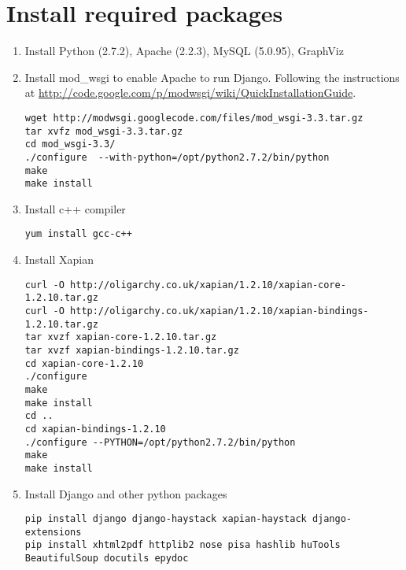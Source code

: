 \documentclass[twoside]{book}
\begin{document}
\section{Install required packages}
\begin{enumerate}
\item Install Python (2.7.2), Apache (2.2.3), MySQL (5.0.95), GraphViz
	
\item Install mod\_wsgi to enable Apache to run Django. Following the instructions at \url{http://code.google.com/p/modwsgi/wiki/QuickInstallationGuide}.
\begin{verbatim}
wget http://modwsgi.googlecode.com/files/mod_wsgi-3.3.tar.gz
tar xvfz mod_wsgi-3.3.tar.gz
cd mod_wsgi-3.3/
./configure  --with-python=/opt/python2.7.2/bin/python
make
make install
\end{verbatim}
	
\item Install c++ compiler
\begin{verbatim}
yum install gcc-c++
\end{verbatim}
  
\item Install Xapian
\begin{verbatim}
curl -O http://oligarchy.co.uk/xapian/1.2.10/xapian-core-1.2.10.tar.gz
curl -O http://oligarchy.co.uk/xapian/1.2.10/xapian-bindings-1.2.10.tar.gz
tar xvzf xapian-core-1.2.10.tar.gz
tar xvzf xapian-bindings-1.2.10.tar.gz
cd xapian-core-1.2.10
./configure
make
make install
cd ..
cd xapian-bindings-1.2.10
./configure --PYTHON=/opt/python2.7.2/bin/python
make
make install
\end{verbatim}
		
\item Install Django and other python packages
\begin{verbatim}
pip install django django-haystack xapian-haystack django-extensions
pip install xhtml2pdf httplib2 nose pisa hashlib huTools BeautifulSoup docutils epydoc
\end{verbatim}


\end{enumerate}
\end{document}
